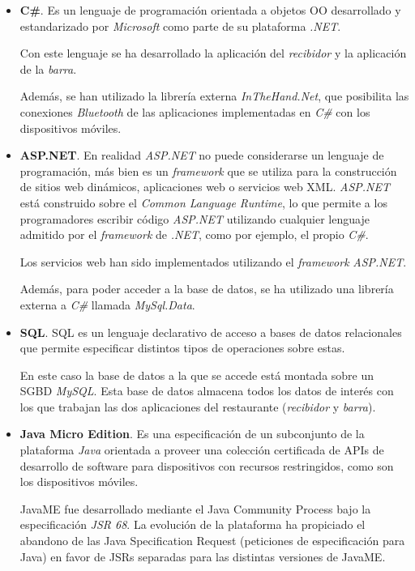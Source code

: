   \begin{itemize} 
  \item \textbf{C\#}.
  Es un lenguaje de programación orientada a objetos
  \acs{OO} desarrollado y estandarizado por \emph{Microsoft} como parte de
  su plataforma \emph{.NET}.

  Con este lenguaje se ha desarrollado la aplicación del \emph{recibidor} y
  la aplicación de la \emph{barra}.

  Además, se han utilizado la librería externa \emph{InTheHand.Net}, que
  posibilita las conexiones \emph{Bluetooth} de las aplicaciones implementadas
  en \emph{C\#} con los dispositivos móviles.

  \item \textbf{ASP.NET}.
  En realidad \emph{\acs{ASP}.NET} no puede 
  considerarse un lenguaje de programación, más bien es un \emph{framework} 
  que se utiliza para la construcción de sitios web dinámicos, aplicaciones 
  web o servicios web \acs{XML}. \emph{ASP.NET} está construido sobre el
  \emph{Common Language Runtime}, lo que permite a los programadores escribir 
  código \emph{ASP.NET} utilizando cualquier lenguaje admitido por el
  \emph{framework} de \emph{.NET}, como por ejemplo, el propio \emph{C\#}.

  Los servicios web han sido implementados utilizando el \emph{framework}
  \emph{ASP.NET}.

  Además, para poder acceder a la base de datos, se ha utilizado una librería
  externa a \emph{C\#} llamada \emph{MySql.Data}.

  \item \textbf{SQL}.
  \acs{SQL} es un lenguaje declarativo de acceso a bases de
  datos relacionales que permite especificar distintos tipos de operaciones
  sobre estas.

  En este caso la base de datos a la que se accede está montada sobre un
  \acs{SGBD} \emph{MySQL}. Esta base de datos almacena todos los datos de
  interés con los que trabajan las dos aplicaciones del restaurante
  (\emph{recibidor} y \emph{barra}).

  \item \textbf{Java Micro Edition}.
  Es una especificación de un subconjunto de la
  plataforma \emph{Java} orientada a proveer una colección certificada de
  \acs{API}s de desarrollo de software para dispositivos con recursos
  restringidos, como son los dispositivos móviles.

  \acs{JavaME} fue desarrollado mediante el Java Community Process bajo la 
  especificación \emph{JSR 68}. La evolución de la plataforma ha propiciado el 
  abandono de las Java Specification Request (peticiones de especificación 
  para Java) en favor de JSRs separadas para las distintas versiones de JavaME.


\end{itemize}
